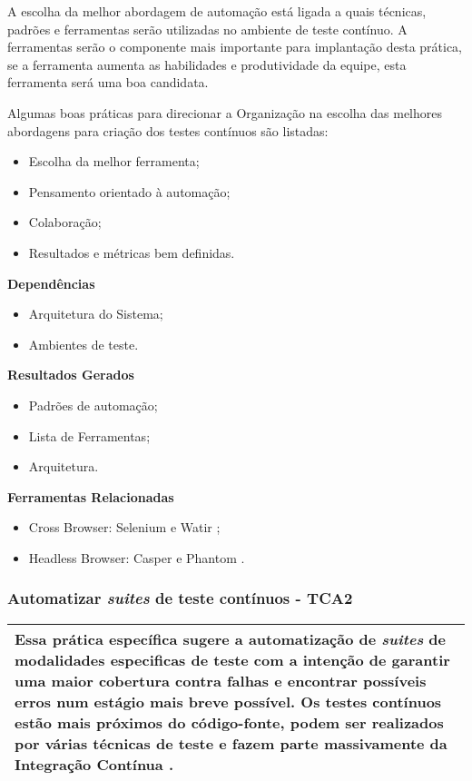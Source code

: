 A escolha da melhor abordagem de automação está ligada a quais técnicas, padrões e ferramentas serão utilizadas no ambiente de teste contínuo. A ferramentas serão o componente mais importante para implantação desta prática, se a ferramenta aumenta as habilidades e produtividade da equipe, esta ferramenta será uma boa candidata.

Algumas boas práticas para direcionar a Organização na escolha das melhores abordagens para criação dos testes contínuos são listadas:

\begin{itemize}
	\item Escolha da melhor ferramenta;
	\item Pensamento orientado à automação;
	\item Colaboração;
	\item Resultados e métricas bem definidas.
\end{itemize}

\textbf{Dependências}
\begin{itemize}
    \item Arquitetura do Sistema;
    \item Ambientes de teste.
\end{itemize}

\textbf{Resultados Gerados}
\begin{itemize}
    \item Padrões de automação;
    \item Lista de Ferramentas;
    \item Arquitetura.
\end{itemize}

\textbf{Ferramentas Relacionadas}
\begin{itemize}
    \item Cross Browser: Selenium \cite{Selenium} e Watir \cite{Watir};
    \item Headless Browser: Casper \cite{Casper} e Phantom \cite{Phantom}.
\end{itemize}

\subsubsection{Automatizar \textit{suites} de teste contínuos - TCA2}
\label{sec:tca2}

\begin{table}[H]
\centering
\begin{tabular}{|p{130mm}|}
\hline
Essa prática específica sugere a automatização de \textit{suites} de modalidades especificas de teste com a intenção de garantir uma maior cobertura contra falhas e encontrar possíveis erros num estágio mais breve possível. Os testes contínuos estão mais próximos do código-fonte, podem ser realizados por várias técnicas de teste e fazem parte massivamente da Integração Contínua \cite{BRAGA2015}.\\ 
\hline
\end{tabular}
\end{table}

